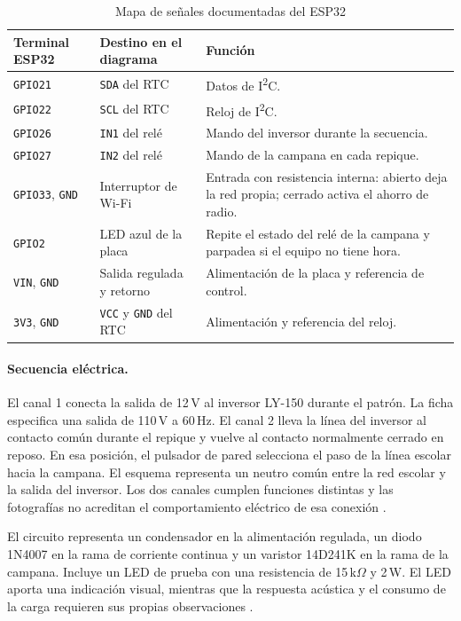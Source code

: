 \documentclass[a4paper,11pt]{article}
\newcommand{\senal}[1]{\texttt{#1}}
\begin{document}
\begin{table}[H]
\centering\small
\caption{Mapa de señales documentadas del ESP32}
\label{tab:gpio}
\begin{tabularx}{\linewidth}{@{}P{3.20cm}P{3.70cm}Y@{}}
\toprule
\textbf{Terminal ESP32} & \textbf{Destino en el diagrama} & \textbf{Función} \\
\midrule
\senal{GPIO21} & \senal{SDA} del RTC & Datos de I\textsuperscript{2}C. \\
\senal{GPIO22} & \senal{SCL} del RTC & Reloj de I\textsuperscript{2}C. \\
\senal{GPIO26} & \senal{IN1} del relé & Mando del inversor durante la secuencia. \\
\senal{GPIO27} & \senal{IN2} del relé & Mando de la campana en cada repique. \\
\senal{GPIO33}, \senal{GND} & Interruptor de Wi-Fi & Entrada con resistencia interna: abierto deja la red propia; cerrado activa el ahorro de radio. \\
\senal{GPIO2} & LED azul de la placa & Repite el estado del relé de la campana y parpadea si el equipo no tiene hora. \\
\senal{VIN}, \senal{GND} & Salida regulada y retorno & Alimentación de la placa y referencia de control. \\
\senal{3V3}, \senal{GND} & \senal{VCC} y \senal{GND} del RTC & Alimentación y referencia del reloj. \\
\bottomrule
\end{tabularx}
\end{table}

\paragraph{Secuencia eléctrica.}
El canal 1 conecta la salida de 12\,V al inversor LY-150 durante el patrón. La ficha especifica una salida de 110\,V a 60\,Hz. El canal 2 lleva la línea del inversor al contacto común durante el repique y vuelve al contacto normalmente cerrado en reposo. En esa posición, el pulsador de pared selecciona el paso de la línea escolar hacia la campana. El esquema representa un neutro común entre la red escolar y la salida del inversor. Los dos canales cumplen funciones distintas y las fotografías no acreditan el comportamiento eléctrico de esa conexión \cite{ficha,diagrama}.

El circuito representa un condensador en la alimentación regulada, un diodo 1N4007 en la rama de corriente continua y un varistor 14D241K en la rama de la campana. Incluye un LED de prueba con una resistencia de 15\,k$\Omega$ y 2\,W. El LED aporta una indicación visual, mientras que la respuesta acústica y el consumo de la carga requieren sus propias observaciones \cite{diagrama}.
\end{document}

